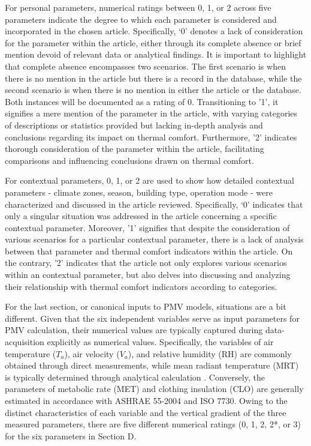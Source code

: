 \documentclass[final,3p,times,12pt]{elsarticle}
\begin{document}
 
For personal parameters, numerical ratings between 0, 1, or 2 across five parameters indicate the degree to which each parameter is considered and incorporated in the chosen article. Specifically, ‘0' denotes a lack of consideration for the parameter within the article, either through its complete absence or brief mention devoid of relevant data or analytical findings. It is important to highlight that complete absence encompasses two scenarios. The first scenario is when there is no mention in the article but there is a record in the database, while the second scenario is when there is no mention in either the article or the database. Both instances will be documented as a rating of 0. Transitioning to '1', it signifies a mere mention of the parameter in the article, with varying categories of descriptions or statistics provided but lacking in-depth analysis and conclusions regarding its impact on thermal comfort. Furthermore, '2' indicates thorough consideration of the parameter within the article, facilitating comparisons and influencing conclusions drawn on thermal comfort.

For contextual parameters, 0, 1, or 2 are used to show how detailed contextual parameters - climate zones, season, building type, operation mode - were characterized and discussed in the article reviewed. Specifically, ‘0' indicates that only a singular situation was addressed in the article concerning a specific contextual parameter. Moreover, '1' signifies that despite the consideration of various scenarios for a particular contextual parameter, there is a lack of analysis between that parameter and thermal comfort indicators within the article. On the contrary, '2' indicates that the article not only explores various scenarios within an contextual parameter, but also delves into discussing and analyzing their relationship with thermal comfort indicators according to categories.

For the last section, or canonical inputs to PMV models, situations are a bit different. Given that the six independent variables serve as input parameters for PMV calculation, their numerical values are typically captured during data-acquisition explicitly as numerical values. Specifically, the variables of air temperature ($T_a$), air velocity ($V_a$), and relative humidity (RH) are commonly obtained through direct measurements, while mean radiant temperature (MRT) is typically determined through analytical calculation \cite{guoSimulationMeasurementAir2020,guoUnderstandingMeanRadiant2020}. Conversely, the parameters of metabolic rate (MET) and clothing insulation (CLO) are generally estimated in accordance with ASHRAE 55-2004 and ISO 7730. Owing to the distinct characteristics of each variable and the vertical gradient of the three measured parameters, there are five different numerical ratings (0, 1, 2, 2*, or 3) for the six parameters in Section D. 
\end{document}
